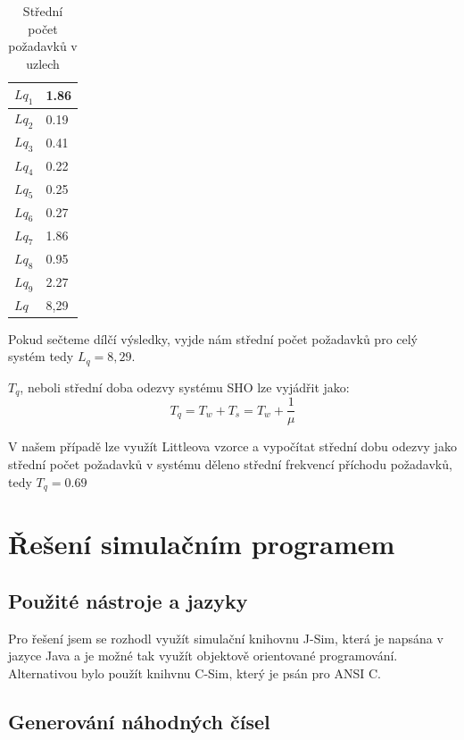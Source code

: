 \documentclass{article}
\begin{document}
\begin{table} [ht!]
\centering
    \begin{tabular}{|l|l|}
    \hline
   $Lq_1$     & 1.86 \\ \hline
    $Lq_2$  & 0.19 \\ \hline
    $Lq_3$     & 0.41 \\ \hline
    $Lq_4$     & 0.22 \\ \hline
    $Lq_5$     & 0.25 \\ \hline
    $Lq_6$      & 0.27 \\ \hline
    $Lq_7$      & 1.86 \\ \hline
    $Lq_8$      & 0.95 \\ \hline
    $Lq_9$      & 2.27 \\ \hline
    \hline
    $Lq$      & 8,29 \\ \hline
    \end{tabular}
    \caption {Střední počet požadavků v uzlech}
\end{table}

Pokud sečteme dílčí výsledky, vyjde nám střední počet požadavků pro celý systém tedy $L_q = 8,29$.

$T_q$, neboli střední doba odezvy systému SHO lze vyjádřit jako:
$$
T_q = T_w + T_s = T_w + \frac{1}{\mu}
$$

V našem případě lze využít Littleova vzorce a vypočítat střední dobu odezvy jako střední počet požadavků v systému děleno střední frekvencí příchodu požadavků, tedy $T_q = 0.69$




\section{Řešení simulačním programem}%

\subsection{Použité nástroje a jazyky}
Pro řešení jsem se rozhodl využít simulační knihovnu J-Sim, která je napsána v jazyce Java a je možné tak využít objektově orientované programování.
Alternativou bylo použít knihvnu C-Sim, který je psán pro ANSI C.

\subsection{Generování náhodných čísel}
\end{document}
